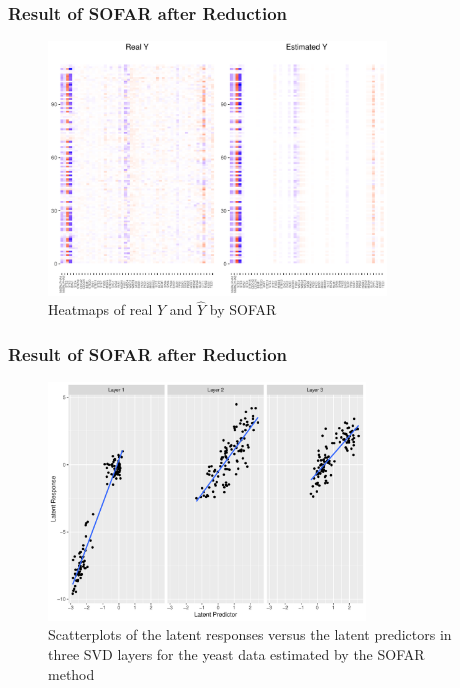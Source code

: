 \begin{frame}
    \frametitle{Result of SOFAR after Reduction}
    \begin{figure}[h]
        \centering
        \includegraphics[width=0.8\textwidth]{./figs/heatmap2.pdf}
        \caption{Heatmaps of real $Y$ and $\hat{Y}$ by SOFAR}
    \end{figure}
\end{frame}

\begin{frame}
    \frametitle{Result of SOFAR after Reduction}
    \begin{figure}[h]
        \centering
        \includegraphics[width=0.75\textwidth]{./figs/letent2.pdf}
        \caption{Scatterplots of the latent responses versus the latent predictors in three SVD layers for the yeast data estimated by the SOFAR method}
    \end{figure}
\end{frame}

